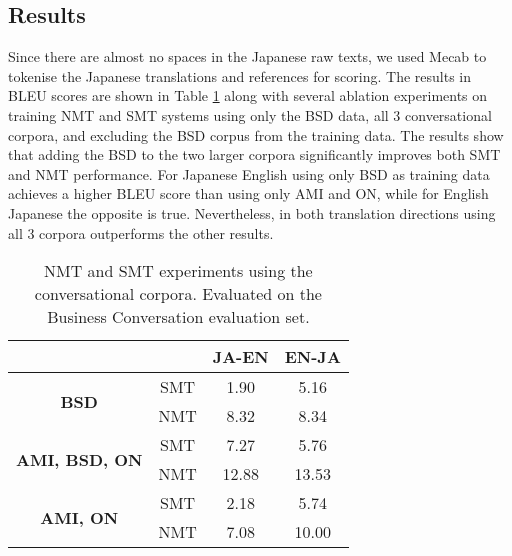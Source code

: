 \documentclass[11pt,a4paper]{article}
\begin{document}
\subsection{Results}
\label{sec:mt-results}

Since there are almost no spaces in the Japanese raw texts, we used Mecab to tokenise the Japanese translations and references for scoring. The results in BLEU scores \cite{Papineni2001BLEU} are shown in Table \ref{tab:nmt-result-table-2} along with several ablation experiments on training NMT and SMT systems using only the BSD data, all 3 conversational corpora, and excluding the BSD corpus from the training data. The results show that adding the BSD to the two larger corpora significantly improves both SMT and NMT performance. For Japanese  English using only BSD as training data achieves a higher BLEU score than using only AMI and ON, while for English  Japanese the opposite is true. Nevertheless, in both translation directions using all 3 corpora outperforms the other results. 

\begin{table}[t]
\begin{small}
    \centering
    \begin{tabular}{|c|c|c|c|}
    \hline
                        \multicolumn{2}{|c|}{} & JA-EN & EN-JA \\ \hline
    \multirow{2}{*}{\textbf{BSD}}          & SMT & 1.90 & 5.16 \\ 
                                           & NMT & 8.32 & 8.34 \\ \hline
    \multirow{2}{*}{\textbf{AMI, BSD, ON}} & SMT & 7.27 & 5.76 \\ 
                                           & NMT & 12.88 & 13.53 \\ \hline
    \multirow{2}{*}{\textbf{AMI, ON}}      & SMT & 2.18 & 5.74 \\ 
                                           & NMT & 7.08 & 10.00 \\ \hline
    \end{tabular}
    \caption{NMT and SMT experiments using the conversational corpora. Evaluated on the Business Conversation evaluation set.}
    \label{tab:nmt-result-table-2}
    \end{small}
\end{table}
\end{document}
